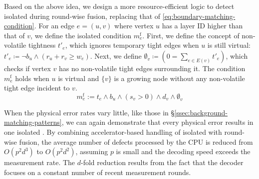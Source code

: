 Based on the above idea, we design a more resource-efficient logic to detect isolated \confs during round-wise fusion, replacing that of \autoref{eq:boundary-matching-condition}.
For an edge $e = (u, v)$ where vertex $u$ has a layer ID higher than that of $v$, we define the isolated \conf condition $m^{\text{f}}_e$.
First, we define the concept of non-volatile tightness $t'_e$, which ignores temporary tight edges when $u$ is still virtual: $t'_e \coloneq \neg b_u \land (r_u + r_v \ge w_e)$.
Next, we define $\emptyset_v \coloneq (0 = \sum_{e\in E(v)} t'_e)$, which checks if vertex $v$ has no non-volatile tight edges surrounding it.
The condition $m^{\text{f}}_e$ holds when $u$ is virtual and $\{v\}$ is a growing node without any non-volatile tight edge incident to $v$.
\begin{equation}
m^{\text{f}}_e := t_e \land b_u \land (s_v > 0) \land d_v \land \emptyset_v \label{eq:fusion-matching-condition}
\end{equation}

When the physical error rates vary little, like those in \S\ref{ssec:background-matching-patterns}, we can again demonstrate that every physical error results in one isolated \conf.
By combining accelerator-based handling of isolated \confs with round-wise fusion, the average number of defects processed by the CPU is reduced from $O(p^2 d^3)$ to $O(p^2 d^2)$, assuming $p$ is small and the decoding speed exceeds the measurement rate.
The $d$-fold reduction results from the fact that the decoder focuses on a constant number of recent measurement rounds.
